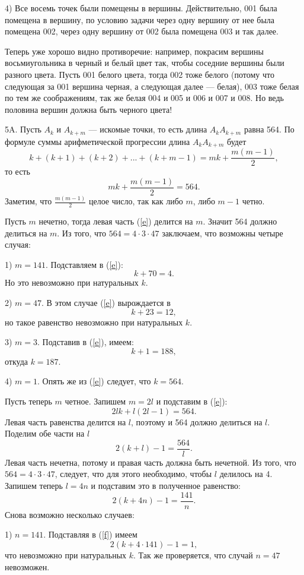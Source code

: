 \documentclass[12pt]{amsart}
\theoremstyle{definition}
\theoremstyle{remark}
\theoremstyle{plain}
\begin{document}
4) Все восемь точек были помещены в вершины. Действительно, 001 была помещена в вершину, по условию задачи через одну вершину от нее была помещена 002, через одну вершину от 002 была помещена 003 и так далее.

Теперь уже хорошо видно противоречие: например, покрасим вершины восьмиугольника в черный и белый цвет так, чтобы соседние вершины были разного цвета. Пусть 001 белого цвета, тогда 002 тоже белого (потому что следующая за 001 вершина черная, а следующая далее --- белая), 003 тоже белая по тем же соображениям, так же белая 004 и 005 и 006 и 007 и 008. Но ведь половина вершин должна быть черного цвета!

5A. Пусть $A_k$ и $A_{k+m}$ --- искомые точки, то есть длина $A_kA_{k+m}$ равна 564. По формуле суммы арифметической прогрессии длина $A_kA_{k+m}$ будет
$$
k+(k+1)+(k+2)+...+(k+m-1)=mk+\frac{m(m-1)}{2},
$$
то есть
\begin{equation}
\label{e} mk+\frac{m(m-1)}{2}=564.
\end{equation}
Заметим, что $\frac{m(m-1)}{2}$ целое число, так как либо $m$, либо $m-1$ четно.

Пусть $m$ нечетно, тогда левая часть (\ref{e}) делится на $m$. Значит 564 должно делиться на $m$. Из того, что $564=4\cdot 3\cdot 47$ заключаем, что возможны четыре случая:

1) $m=141$. Подставляем в (\ref{e}):
$$
k+70=4.
$$
Но это невозможно при натуральных $k$.

2) $m=47$. В этом случае (\ref{e}) вырождается в
$$
k+23=12,
$$
но такое равенство невозможно при натуральных $k$.

3) $m=3$. Подставив в (\ref{e}), имеем:
$$
k+1=188,
$$
откуда $k=187$.

4) $m=1$. Опять же из (\ref{e}) следует, что $k=564$.

Пусть теперь $m$ четное. Запишем $m=2l$ и подставим в (\ref{e}):
$$
2lk+l(2l-1)=564.
$$
Левая часть равенства делится на $l$, поэтому и 564 должно делиться на $l$. Поделим обе части на $l$
$$
2(k+l)-1=\frac{564}{l}.
$$
Левая часть нечетна, потому и правая часть должна быть нечетной. Из того, что $564=4\cdot3\cdot47$, следует, что для этого необходимо, чтобы $l$ делилось на 4. Запишем теперь $l=4n$ и подставим это в полученное равенство:
\begin{equation}
\label{f} 2(k+4n)-1=\frac{141}{n}.
\end{equation}
Снова возможно несколько случаев:

1) $n=141$. Подставляя в (\ref{f}) имеем
$$
2(k+4\cdot 141)-1=1,
$$
что невозможно при натуральных $k$. Так же проверяется, что случай $n=47$ невозможен.
\end{document}
